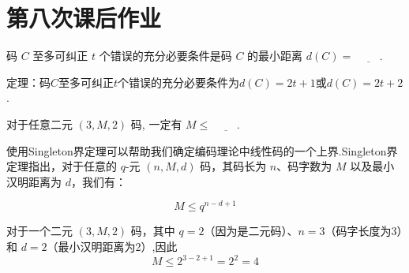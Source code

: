 \newpage
\section{第八次课后作业}
\begin{tcolorbox}[breakable,colback=blue!5!white,colframe=blue!75!black,
 title= 填空题]

码 $ C $ 至多可纠正 $ t $ 个错误的充分必要条件是码 $ C $ 的最小距离 $ d(C)= $ $\underline{\hspace{2em}}$.

 \tcblower
定理：码$C$至多可纠正$t$个错误的充分必要条件为$d(C)=2t+1$或$d(C)=2t+2$.
 \end{tcolorbox}



 \begin{tcolorbox}[breakable,colback=blue!5!white,colframe=blue!75!black,
 title= 填空题]

对于任意二元 $ (3, M, 2) $ 码, 一定有 $ M \leq $ $\underline{\hspace{2em}}$.

 \tcblower
使用Singleton界定理可以帮助我们确定编码理论中线性码的一个上界.Singleton界定理指出，对于任意的 \(q\)-元 \((n, M, d)\) 码，其码长为 \(n\)、码字数为 \(M\) 以及最小汉明距离为 \(d\)，我们有：

\[
M \leq q^{n-d+1}
\]

对于一个二元 \((3, M, 2)\) 码，其中 \(q = 2\)（因为是二元码）、\(n = 3\)（码字长度为3）和 \(d = 2\)（最小汉明距离为2）,因此
   \[
   M \leq 2^{3-2+1} = 2^2 = 4
   \]
 \end{tcolorbox}



